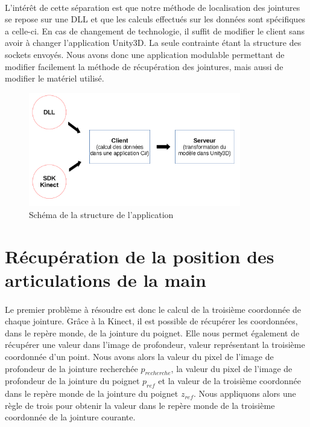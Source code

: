 \paragraph{}
L'intérêt de cette séparation est que notre méthode de localisation des jointures se repose sur une 
DLL et que les calculs effectués sur les données sont spécifiques a celle-ci. En cas de changement de 
technologie, il suffit de modifier le client sans avoir à changer l'application Unity3D. La seule contrainte
étant la structure des sockets envoyés. Nous avons donc une application modulable permettant de modifier 
facilement la méthode de récupération des jointures, mais aussi de modifier le matériel utilisé.

\begin{figure}[H]
  \label{schema_application}
  \begin{center}
    \includegraphics[width=350px]{images/schemaAppli.png}
    \caption{Schéma de la structure de l'application}
  \end{center}
\end{figure}

\section{Récupération de la position des articulations de la main}
\label{Real_get_art}
\paragraph{}
Le premier problème à résoudre est donc le calcul de la troisième coordonnée de chaque jointure. Grâce à la Kinect,
il est possible de récupérer les coordonnées, dans le repère monde, de la jointure du poignet. Elle nous permet
également de récupérer une valeur dans l'image de profondeur, valeur représentant la troisième coordonnée d'un point.
Nous avons alors la valeur du pixel de l'image de profondeur de la jointure recherchée $p_{recherche}$, la valeur
du pixel de l'image de profondeur de la jointure du poignet $p_{ref}$ et la valeur de la troisième coordonnée dans 
le repère monde de la jointure du poignet $z_{ref}$. Nous appliquons alors une règle de trois pour obtenir 
la valeur dans le repère monde de la troisième coordonnée de la jointure courante.

